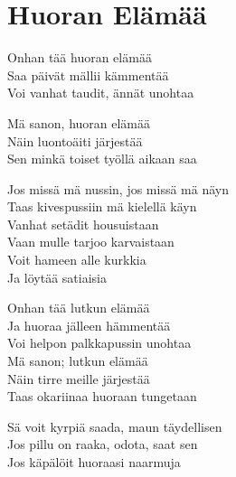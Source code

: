 \section{Huoran Elämää}
Onhan tää huoran elämää\\
Saa päivät mällii kämmentää\\
Voi vanhat taudit, ännät unohtaa

Mä sanon, huoran elämää\\
Näin luontoäiti järjestää\\
Sen minkä toiset työllä aikaan saa

Jos missä mä nussin, jos missä mä näyn\\
Taas kivespussiin mä kielellä käyn\\
Vanhat setädit housuistaan\\
Vaan mulle tarjoo karvaistaan\\
Voit hameen alle kurkkia\\
Ja löytää satiaisia

Onhan tää lutkun elämää\\
Ja huoraa jälleen hämmentää\\
Voi helpon palkkapussin unohtaa\\
Mä sanon; lutkun elämää\\
Näin tirre meille järjestää\\
Taas okariinaa huoraan tungetaan

Sä voit kyrpiä saada, maun täydellisen\\
Jos pillu on raaka, odota, saat sen\\
Jos käpälöit huoraasi naarmuja